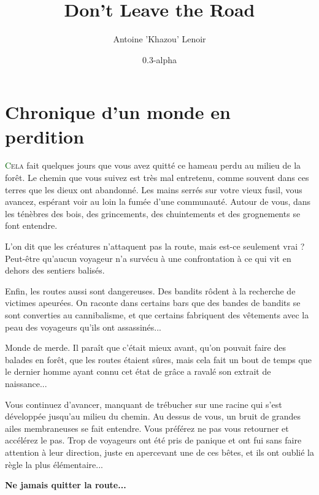 \documentclass[twoside,12pt,english]{book}
\title{Don't Leave the Road}
\author{Antoine 'Khazou' Lenoir}
\date{0.3-alpha}
\newcommand*\initfamily{\usefont{U}{Acorn}{xl}{n}}
\begin{document}

\maketitle

\section*{Chronique d'un monde en perdition}

\lettrine[lines=3]{\initfamily\textcolor{darkgreen}{C}}{ela} fait quelques jours que vous avez quitté ce hameau perdu au milieu de la forêt. Le chemin que vous suivez est très mal entretenu, comme souvent dans ces terres que les dieux ont abandonné. Les mains serrés sur votre vieux fusil, vous avancez, espérant voir au loin la fumée d'une communauté. Autour de vous, dans les ténèbres des bois, des grincements, des chuintements et des grognements se font entendre.

L'on dit que les créatures n'attaquent pas la route, mais est-ce seulement vrai ? Peut-être qu'aucun voyageur n'a survécu à une confrontation à ce qui vit en dehors des sentiers balisés.

Enfin, les routes aussi sont dangereuses. Des bandits rôdent à la recherche de victimes apeurées. On raconte dans certains bars que des bandes de bandits se sont converties au cannibalisme, et que certains fabriquent des vêtements avec la peau des voyageurs qu'ils ont assassinés...

Monde de merde. Il paraît que c'était mieux avant, qu'on pouvait faire des balades en forêt, que les routes étaient sûres, mais cela fait un bout de temps que le dernier homme ayant connu cet état de grâce a ravalé son extrait de naissance...

Vous continuez d'avancer, manquant de trébucher sur une racine qui s'est développée jusqu'au milieu du chemin. Au dessus de vous, un bruit de grandes ailes membraneuses se fait entendre. Vous préférez ne pas vous retourner et accélérez le pas. Trop de voyageurs ont été pris de panique et ont fui sans faire attention à leur direction, juste en apercevant une de ces bêtes, et ils ont oublié la règle la plus élémentaire...

\textbf{Ne jamais quitter la route...}

\tableofcontents






\end{document}
